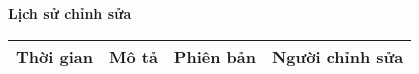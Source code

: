 \documentclass[./main.tex]{subfiles}
\begin{document}
\begin{center}
	\Large{\textbf{Lịch sử chỉnh sửa}}
	\begin{table}[H]
		\begin{tabular}{|p{}|p{}|p{}|p{}|}
			\hline
			\textbf{Thời gian} & \textbf{Mô tả} & \textbf{Phiên bản} & \textbf{Người chỉnh sửa} \\ \hline
		\end{tabular}
	\end{table}
\end{center}
\end{document}
